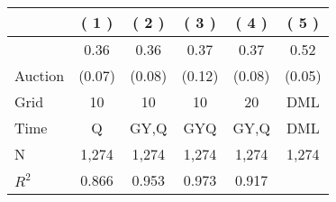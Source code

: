 
\begin{tabular}{lccccc}
\toprule
 & ( 1 ) & ( 2 ) & ( 3 ) & ( 4 ) & ( 5 )\\
\midrule
 & 0.36 & 0.36 & 0.37 & 0.37 & 0.52\\

\multirow{-2}{*}{\raggedright\arraybackslash Auction} & (0.07) & (0.08) & (0.12) & (0.08) & (0.05)\\

\midrule
Grid & 10 & 10 & 10 & 20 & DML\\

Time & Q & GY,Q & GYQ & GY,Q & DML\\

N & 1,274 & 1,274 & 1,274 & 1,274 & 1,274\\

$R^2$ & 0.866 & 0.953 & 0.973 & 0.917 & \\
\bottomrule
\end{tabular}
